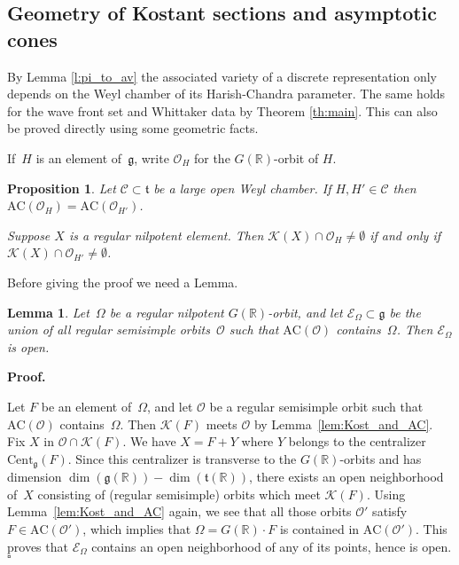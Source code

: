 \documentclass[10pt,leqno]{article}
\newtheorem{lemma}[equation]{Lemma}
\newtheorem{proposition}[equation]{Proposition}
\numberwithin{equation}{section}
\newcommand{\qed}{\hfill $\square$ \medskip}
\newenvironment{proof}[1][Proof]{\noindent\textbf{#1.} }{\qed}
\renewcommand{\O}{\mathcal O}
\newcommand{\R}{\mathbb R}
\newcommand{\K}{\mathcal K}
\renewcommand{\t}{\mathfrak t}
\newcommand{\g}{\mathfrak g}
\newcommand{\AC}{\mathrm{AC}}
\newcommand{\Kostant}[1]{\mathcal{K}(#1)}
\begin{document}
\subsection{Geometry of Kostant sections and asymptotic cones}

By Lemma \ref{l:pi_to_av} the associated variety of a discrete representation only depends on the Weyl chamber of its Harish-Chandra parameter. 
The same holds for the wave front set and Whittaker data by Theorem \ref{th:main}. This can also be proved directly 
using some geometric facts.


If~$H$ is an element of~$\g$, write $\O_H$ for the $G(\R)$-orbit of $H$.

\begin{proposition}\label{prop:AC_chamber} Let $\mathcal{C} \subset \t$ be a large open Weyl chamber.
  If $H,H'\in\mathcal{C}$  then $\AC(\mathcal{O}_H)=\AC(\mathcal{O}_{H'})$.

  Suppose $X$ is a regular nilpotent element. Then $\K(X)\cap \O_H\ne \emptyset$ if and only if $\K(X)\cap \O_{H'}\ne\emptyset$.
\end{proposition}

Before giving the proof we need a Lemma.

\begin{lemma}\label{lem:AC_containment} Let~$\Omega$ be a regular nilpotent $G(\R)$-orbit, and let $\mathcal{E}_\Omega \subset \g$ be the union of all regular semisimple orbits~$\mathcal{O}$ such that $\AC(\mathcal{O})$ contains~$\Omega$. Then $\mathcal{E}_\Omega$ is open. 
\end{lemma}

\begin{proof}

Let $F$ be an element of~$\Omega$, and let $\mathcal{O}$  be a regular semisimple orbit such that $\AC(\mathcal{O})$ contains~$\Omega$.
Then $\Kostant{F}$ meets $\mathcal{O}$ by  Lemma~\ref{lem:Kost_and_AC}. 
Fix $X$ in $\mathcal{O} \cap \Kostant{F}$.
We have $X =F+Y$ where $Y$ belongs to the centralizer $\mathrm{Cent}_\g(F)$.
Since this centralizer is transverse to the $G(\R)$-orbits and has dimension $\dim(\g(\R))-\dim(\t(\R))$,
there exists an open neighborhood of~$X$ consisting of (regular semisimple) orbits  which meet $\Kostant{F}$.
Using Lemma~\ref{lem:Kost_and_AC} again, we see that all those orbits $\mathcal{O}'$ satisfy $F \in \AC(\mathcal{O}')$,
which implies that $\Omega = G(\R) \cdot F$ is contained in $\AC(\mathcal{O}')$.
This proves that $\mathcal{E}_\Omega$ contains an open neighborhood of any of its points, hence is open.   \end{proof}
\end{document}
